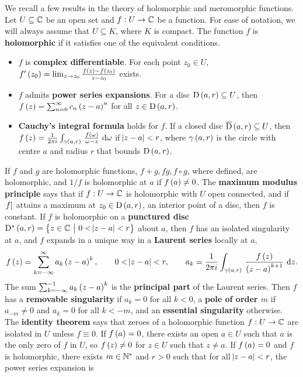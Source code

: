 We recall a few results in the theory of holomorphic and meromorphic functions. Let $ U \subseteq \mathbb{C} $ be an open set and $ f : U \to \mathbb{C} $ be a function. For ease of notation, we will always assume that $ U \subseteq K $, where $ K $ is compact. The function $ f $ is \textbf{holomorphic} if it satisfies one of the equivalent conditions.
\begin{itemize}
\item $ f $ is \textbf{complex differentiable}. For each point $ z_0 \in U $, $ f'\br{z_0} = \lim_{z \to z_0} \tfrac{f\br{z} - f\br{z_0}}{z - z_0} $ exists.
\item $ f $ admits \textbf{power series expansions}. For a disc $ \D\br{a, r} \subseteq U $, then $ f\br{z} = \sum_{n = 0}^\infty c_n\br{z - a}^n $ for all $ z \in \D\br{a, r} $.
\item \textbf{Cauchy's integral formula} holds for $ f $. If a closed disc $ \overline{\D}\br{a, r} \subseteq U $, then $ f\br{z} = \tfrac{1}{2\pi i}\intd{\gamma\br{a, r}}{}{\tfrac{f\br{\omega}}{\omega - z}}{\omega} $ if $ \abs{z - a} < r $, where $ \gamma\br{a, r} $ is the circle with centre $ a $ and radius $ r $ that bounds $ \D\br{a, r} $.
\end{itemize}
If $ f $ and $ g $ are holomorphic functions, $ f + g, fg, f \circ g $, where defined, are holomorphic, and $ 1 / f $ is holomorphic at $ a $ if $ f\br{a} \ne 0 $. The \textbf{maximum modulus principle} says that if $ f : U \to \mathbb{C} $ is holomorphic with $ U $ open connected, and if $ \abs{f} $ attains a maximum at $ z_0 \in \D\br{a, r} $, an interior point of a disc, then $ f $ is constant. If $ f $ is holomorphic on a \textbf{punctured disc} $ \D^*\br{a, r} = \cbr{z \in \CC \st 0 < \abs{z - a} < r} $ about $ a $, then $ f $ has an isolated singularity at $ a $, and $ f $ expands in a unique way in a \textbf{Laurent series} locally at $ a $,
$$ f\br{z} = \sum_{k = -\infty}^\infty a_k\br{z - a}^k, \qquad 0 < \abs{z - a} < r, \qquad a_k = \dfrac{1}{2\pi i}\intd{\gamma\br{a, r}}{}{\dfrac{f\br{z}}{\br{z - a}^{k + 1}}}{z}. $$
The sum $ \sum_{k = -\infty}^{-1} a_k\br{z - a}^k $ is the \textbf{principal part} of the Laurent series. Then $ f $ has a \textbf{removable singularity} if $ a_k = 0 $ for all $ k < 0 $, a \textbf{pole of order $ m $} if $ a_{-m} \ne 0 $ and $ a_k = 0 $ for all $ k < -m $, and an \textbf{essential singularity} otherwise. The \textbf{identity theorem} says that zeroes of a holomorphic function $ f : U \to \mathbb{C} $ are isolated in $ U $ unless $ f \equiv 0 $. If $ f\br{a} = 0 $, there exists an open $ a \in U $ such that $ a $ is the only zero of $ f $ in $ U $, so $ f\br{z} \ne 0 $ for $ z \in U $ such that $ z \ne a $. If $ f\br{a} = 0 $ and $ f $ is holomorphic, there exists $ m \in \mathbb{N}^* $ and $ r > 0 $ such that for all $ \abs{z - a} < r $, the power series expansion is
